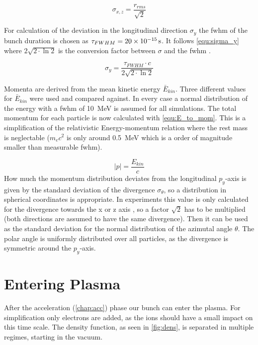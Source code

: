 \documentclass[bachelor_thesis]{subfiles}
\begin{document}
\begin{equation}
\sigma_{x,z}=\frac{r_{rms}}{\sqrt{2}} 
\label{equ:sigma_x}
\end{equation}

For calculation of the deviation in the longitudinal direction $\sigma_y$ the \gls{fwhm} of the bunch duration is chosen as $\tau_{FWHM}=\qty{20d-15}{\s}$. 
It follows \autoref{equ:sigma_y} where $2\sqrt{2\cdot\ln{2}}$ is the conversion factor between $\sigma$ and the \gls{fwhm} .

\begin{equation}
\sigma_{y}=\frac{\tau_{FWHM}\cdot c}{2\sqrt{2\cdot\ln{2}}}
\label{equ:sigma_y}
\end{equation} 

Momenta are derived from the mean kinetic energy $\bar{E}_{kin}$. Three different  values for $\bar{E}_{kin}$ were used and compared against. 
In every case a normal distribution of the energy with a \gls{fwhm} of \qty{10}{\MeV} is assumed for all simulations. The total momentum for each particle is now calculated with \autoref{equ:E_to_mom}.
This is a simplification of the relativistic Energy-momentum relation where the rest mass is neglectable ($m_{e}c^2$ is only around \qty{0.5}{\MeV} which is a order of magnitude smaller than measurable \gls{fwhm}).

\begin{equation}
\left|p\right|=\frac{E_{kin}}{c}
\label{equ:E_to_mom}
\end{equation}
How much the momentum distribution deviates from the longitudinal $p_y$-axis is given by the standard deviation of the divergence $\sigma_{\theta}$, so a distribution in spherical coordinates is appropriate. 
In experiments this value is only calculated for the divergence towards the x or z axis , so a factor $\sqrt{2}$ has to be multiplied (both directions are assumed to have the same divergence).
Then it can be used as the standard deviation for the normal distribution of the azimutal angle $\theta$. The polar angle is uniformly distributed over all particles, as the divergence is symmetric around the $p_y$-axis.


\section{Entering Plasma}\label{chap:plasma}
 After the acceleration (\autoref{chap:acc}) phase our bunch can enter the plasma. For simplification only electrons are added, as the ions should have a small impact on this time scale.
The density function, as seen in \autoref{fig:dens}, is separated in multiple regimes, starting in the vacuum. 
\end{document}
